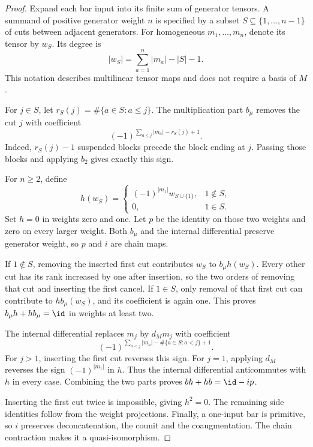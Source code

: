 \begin{proof}
Expand each bar input into its finite sum of generator tensors.
A summand of positive generator weight $n$ is specified by a subset $S\subseteq\{1,\ldots,n-1\}$ of cuts between adjacent generators.
For homogeneous $m_1,\ldots,m_n$, denote its tensor by $w_S$.
Its degree is
\[
 |w_S|=\sum_{a=1}^n|m_a|-|S|-1.
\]
This notation describes multilinear tensor maps and does not require a basis of $M$.

For $j\in S$, let $r_S(j)=\#\{a\in S:a\le j\}$.
The multiplication part $b_\mu$ removes the cut $j$ with coefficient
\begin{equation}\label{eq:cbc:free:cut-sign}
 (-1)^{\sum_{a\le j}|m_a|-r_S(j)+1}.
\end{equation}
Indeed, $r_S(j)-1$ suspended blocks precede the block ending at $j$.
Passing those blocks and applying $b_2$ gives exactly this sign.

For $n\ge2$, define
\begin{equation}\label{eq:cbc:free:homotopy}
 h(w_S)=
 \begin{cases}
  (-1)^{|m_1|}w_{S\cup\{1\}},&1\notin S,\\
  0,&1\in S.
 \end{cases}
\end{equation}
Set $h=0$ in weights zero and one.
Let $p$ be the identity on those two weights and zero on every larger weight.
Both $b_\mu$ and the internal differential preserve generator weight, so $p$ and $i$ are chain maps.

If $1\notin S$, removing the inserted first cut contributes $w_S$ to $b_\mu h(w_S)$.
Every other cut has its rank increased by one after insertion, so the two orders of removing that cut and inserting the first cancel.
If $1\in S$, only removal of that first cut can contribute to $hb_\mu(w_S)$, and its coefficient is again one.
This proves $b_\mu h+hb_\mu=\id$ in weights at least two.

The internal differential replaces $m_j$ by $d_Mm_j$ with coefficient
\[
 (-1)^{\sum_{a<j}|m_a|-\#\{a\in S:a<j\}+1}.
\]
For $j>1$, inserting the first cut reverses this sign.
For $j=1$, applying $d_M$ reverses the sign $(-1)^{|m_1|}$ in $h$.
Thus the internal differential anticommutes with $h$ in every case.
Combining the two parts proves $bh+hb=\id-ip$.

Inserting the first cut twice is impossible, giving $h^2=0$.
The remaining side identities follow from the weight projections.
Finally, a one-input bar is primitive, so $i$ preserves deconcatenation, the counit and the coaugmentation.
The chain contraction makes it a quasi-isomorphism.
\end{proof}

